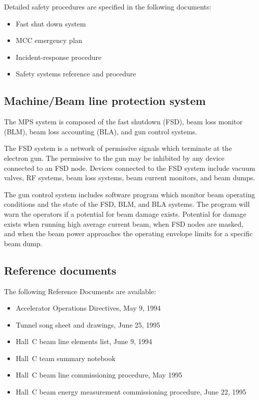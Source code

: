 {Detailed safety procedures are specified in the following documents:

\begin{itemize}
\item{Fast shut down system}
\item{MCC emergency plan}
\item{Incident-response procedure}
\item{Safety systems reference and procedure}
\end{itemize}

\subsection{Machine/Beam line protection system}

The MPS system is composed of the fast shutdown (FSD), beam loss
monitor (BLM), beam loss accounting (BLA), and gun control systems.

The FSD system is a network of permissive signals which terminate
at the electron gun. The permissive to the gun may be inhibited by any 
device connected to an FSD node.
Devices connected to the FSD system include vacuum valves, RF
systems, beam loss systems, beam current monitors, and beam dumps.

The gun control system includes software program which monitor
beam operating conditions and the state of the FSD, BLM, and BLA systems.
The program will warn the operators if a potential for beam damage
exists. Potential for damage exists when running high average current
beam, when FSD nodes are masked, and when the beam power approaches
the operating envelope limits for a specific beam dump.

\subsection{Reference documents}

The following Reference Documents are available:

\begin{itemize}
\item{Accelerator Operations Directives, May 9, 1994}
\item{Tunnel song sheet and drawings, June 25, 1995}
\item{Hall~C beam line elements list, June 9, 1994}
\item{Hall~C team summary notebook}
\item{Hall~C beam line commissioning procedure, May 1995}
\item{Hall~C beam energy measurement commissioning procedure, June 22, 1995}
\end{itemize}

}
